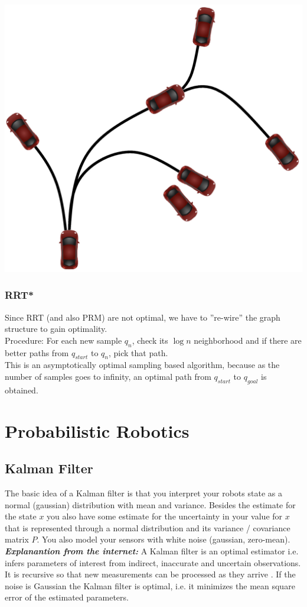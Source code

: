 \begin{multicols*}{2}
\begin{center}
	\includegraphics[width=0.5\columnwidth]{Kinodynamic_RRT.jpg}
\end{center}

\subsubsection{RRT*}
Since RRT (and also PRM) are not optimal, we have to ”re-wire” the graph structure to gain optimality.\\
Procedure: For each new sample $q_n$, check its $\log n$ neighborhood and if there are better paths from $q_{start}$ to $q_n$, pick that path.\\
This is an asymptotically optimal sampling based algorithm, because as the number of samples goes to infinity, an optimal path from $q_{start}$ to $q_{goal}$ is obtained.

\section{Probabilistic Robotics}
\subsection{Kalman Filter}
The basic idea of a Kalman filter is that you interpret your robots state as a normal (gaussian) distribution with mean and variance.
Besides the estimate for the state $x$ you also have some estimate for the uncertainty in your value for $x$ that is represented through a normal distribution and its variance / covariance matrix $P$.
You also model your sensors with white noise (gaussian, zero-mean).\\

\textit{\textbf{Explanantion from the internet:}}
A Kalman filter is an optimal estimator i.e. infers parameters of interest
from indirect, inaccurate and uncertain observations.
It is recursive so that new measurements can be processed as they arrive .
If the noise is Gaussian the Kalman filter is optimal, i.e. it minimizes the mean square error of the estimated parameters.\\


\end{multicols*}
